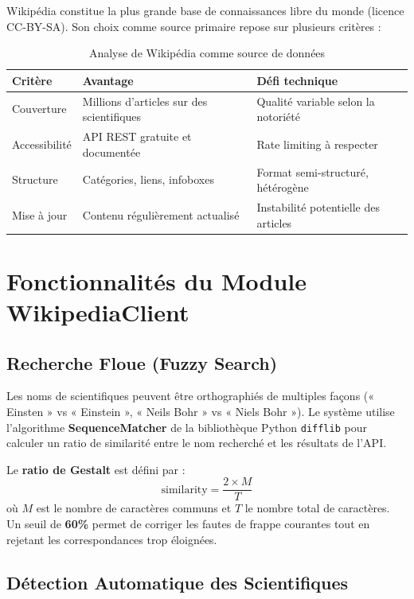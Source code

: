 \documentclass[12pt,a4paper]{report}
\begin{document}
Wikipédia constitue la plus grande base de connaissances libre du monde (licence CC-BY-SA). Son choix comme source primaire repose sur plusieurs critères :

\begin{table}[H]
\centering
\begin{tabular}{|p{3.5cm}|p{5cm}|p{5cm}|}
\hline
\rowcolor{ice500!20}
\textbf{Critère} & \textbf{Avantage} & \textbf{Défi technique} \\
\hline
Couverture & Millions d'articles sur des scientifiques & Qualité variable selon la notoriété \\
\hline
Accessibilité & API REST gratuite et documentée & Rate limiting à respecter \\
\hline
Structure & Catégories, liens, infoboxes & Format semi-structuré, hétérogène \\
\hline
Mise à jour & Contenu régulièrement actualisé & Instabilité potentielle des articles \\
\hline
\end{tabular}
\caption{Analyse de Wikipédia comme source de données}
\end{table}

\section{Fonctionnalités du Module WikipediaClient}

\subsection{Recherche Floue (Fuzzy Search)}

Les noms de scientifiques peuvent être orthographiés de multiples façons (« Einsten » vs « Einstein », « Neils Bohr » vs « Niels Bohr »). Le système utilise l'algorithme \textbf{SequenceMatcher} de la bibliothèque Python \texttt{difflib} pour calculer un ratio de similarité entre le nom recherché et les résultats de l'API.

Le \textbf{ratio de Gestalt} est défini par :
$$\text{similarity} = \frac{2 \times M}{T}$$
où $M$ est le nombre de caractères communs et $T$ le nombre total de caractères. Un seuil de \textbf{60\%} permet de corriger les fautes de frappe courantes tout en rejetant les correspondances trop éloignées.

\subsection{Détection Automatique des Scientifiques}
\end{document}
